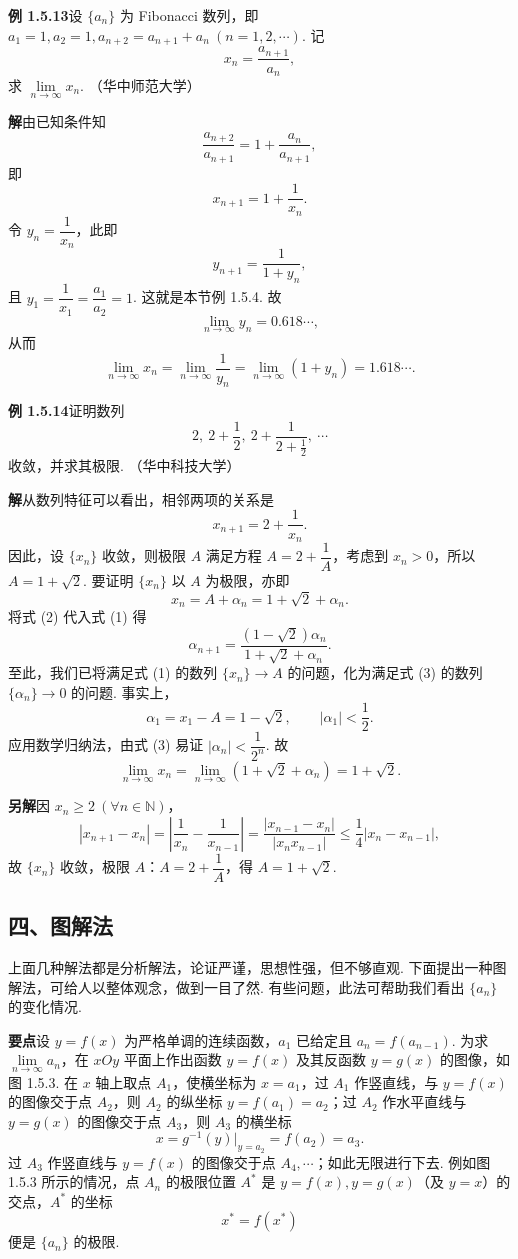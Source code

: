 \documentclass[UTF8, 12pt, fontset=fandol, oneside]{ctexart}
\begin{document}
\noindent\textbf{例 1.5.13}\quad 设 $\{a_n\}$ 为 Fibonacci 数列，即 $a_1=1,a_2=1,a_{n+2}=a_{n+1}+a_n\ (n=1,2,\cdots)$. 记
\[
  x_n=\frac{a_{n+1}}{a_n},
\]
求 $\lim\limits_{n\to\infty}x_n$. （华中师范大学）

\noindent\textbf{解}\quad 由已知条件知
\[
  \frac{a_{n+2}}{a_{n+1}}=1+\frac{a_n}{a_{n+1}},
\]
即
\[
  x_{n+1}=1+\frac1{x_n}.
\]
令 $y_n=\dfrac1{x_n}$，此即
\[
  y_{n+1}=\frac1{1+y_n},
\]
且 $y_1=\dfrac1{x_1}=\dfrac{a_1}{a_2}=1$. 这就是本节例 1.5.4. 故
\[
  \lim_{n\to\infty}y_n=0.618\cdots,
\]
从而
\[
  \lim_{n\to\infty}x_n
  =\lim_{n\to\infty}\frac1{y_n}
  =\lim_{n\to\infty}(1+y_n)
  =1.618\cdots.
\]

\noindent\textbf{例 1.5.14}\quad 证明数列
\[
  2,\ 2+\frac12,\ 2+\frac{1}{2+\frac12},\ \cdots
\]
收敛，并求其极限. （华中科技大学）

\noindent\textbf{解}\quad 从数列特征可以看出，相邻两项的关系是
\[
  x_{n+1}=2+\frac1{x_n}.
\tag{1}
\]
因此，设 $\{x_n\}$ 收敛，则极限 $A$ 满足方程 $A=2+\dfrac1A$，考虑到 $x_n>0$，所以 $A=1+\sqrt2$. 要证明 $\{x_n\}$ 以 $A$ 为极限，亦即
\[
  x_n=A+\alpha_n=1+\sqrt2+\alpha_n.
\tag{2}
\]
将式 (2) 代入式 (1) 得
\[
  \alpha_{n+1}=\frac{(1-\sqrt2)\alpha_n}{1+\sqrt2+\alpha_n}.
\tag{3}
\]
至此，我们已将满足式 (1) 的数列 $\{x_n\}\to A$ 的问题，化为满足式 (3) 的数列 $\{\alpha_n\}\to 0$ 的问题. 事实上，
\[
  \alpha_1=x_1-A=1-\sqrt2,\qquad |\alpha_1|<\frac12.
\]
应用数学归纳法，由式 (3) 易证 $|\alpha_n|<\dfrac1{2^n}$. 故
\[
  \lim_{n\to\infty}x_n
  =\lim_{n\to\infty}(1+\sqrt2+\alpha_n)
  =1+\sqrt2.
\]

\noindent\textbf{另解}\quad 因 $x_n\ge 2\ (\forall n\in\mathbb{N})$，
\[
  |x_{n+1}-x_n|
  =\left|\frac1{x_n}-\frac1{x_{n-1}}\right|
  =\frac{|x_{n-1}-x_n|}{|x_nx_{n-1}|}
  \le \frac14 |x_n-x_{n-1}|,
\]
故 $\{x_n\}$ 收敛，极限 $A$：$A=2+\dfrac1A$，得 $A=1+\sqrt2$.

\subsection*{四、图解法}

上面几种解法都是分析解法，论证严谨，思想性强，但不够直观. 下面提出一种图解法，可给人以整体观念，做到一目了然. 有些问题，此法可帮助我们看出 $\{a_n\}$ 的变化情况.

\noindent\textbf{要点}\quad 设 $y=f(x)$ 为严格单调的连续函数，$a_1$ 已给定且 $a_n=f(a_{n-1})$. 为求 $\lim\limits_{n\to\infty}a_n$，在 $xOy$ 平面上作出函数 $y=f(x)$ 及其反函数 $y=g(x)$ 的图像，如图 1.5.3. 在 $x$ 轴上取点 $A_1$，使横坐标为 $x=a_1$，过 $A_1$ 作竖直线，与 $y=f(x)$ 的图像交于点 $A_2$，则 $A_2$ 的纵坐标 $y=f(a_1)=a_2$；过 $A_2$ 作水平直线与 $y=g(x)$ 的图像交于点 $A_3$，则 $A_3$ 的横坐标
\[
  x=g^{-1}(y)\big|_{y=a_2}=f(a_2)=a_3.
\]
过 $A_3$ 作竖直线与 $y=f(x)$ 的图像交于点 $A_4,\cdots$；如此无限进行下去. 例如图 1.5.3 所示的情况，点 $A_n$ 的极限位置 $A^*$ 是 $y=f(x),y=g(x)$（及 $y=x$）的交点，$A^*$ 的坐标
\[
  x^*=f(x^*)
\]
便是 $\{a_n\}$ 的极限.
\end{document}
